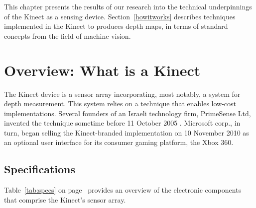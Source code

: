 This chapter presents the results of our research into the technical
underpinnings of the Kinect as a sensing device. Section~\ref{howitworks}
describes techniques implemented in the Kinect to produces depth maps, in terms
of standard concepts from the field of machine vision. %

\section{Overview: What is a Kinect}

The Kinect device is a sensor array incorporating, most notably, a system for
depth measurement. This system relies on a technique that enables low-cost
implementations. Several founders of an Israeli technology firm, PrimeSense Ltd,
invented the technique sometime before 11 October 2005 \cite{ZALEVSKY:2007}.
Microsoft corp., in turn, began selling the Kinect-branded implementation on 10
November 2010 as an optional user interface for its consumer gaming platform,
the Xbox 360.


\subsection{Specifications}

Table~\ref{tab:specs} on page~\pageref{tab:specs} provides an overview of the
electronic components that comprise the Kinect's sensor array.

